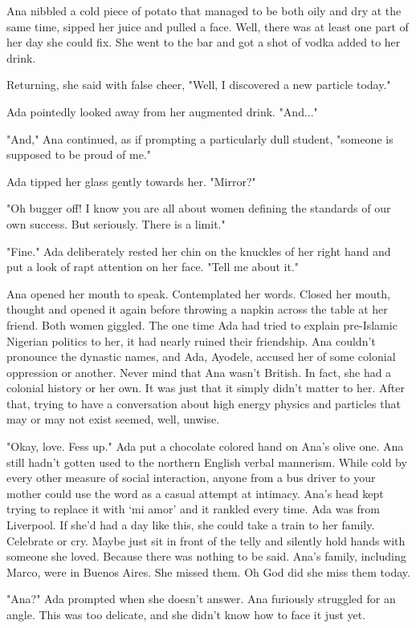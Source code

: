 \documentclass{article}
\begin{document}
Ana nibbled a cold piece of potato that managed to be both oily and dry at the same time, sipped her juice and pulled a face. Well, there was at least one part of her day she could fix. She went to the bar and got a shot of vodka added to her drink. 

Returning, she said with false cheer, "Well, I discovered a new particle today."

Ada pointedly looked away from her augmented drink. "And..."

"And," Ana continued, as if prompting a particularly dull student, "someone is supposed to be proud of me."

Ada tipped her glass gently towards her. "Mirror?"

"Oh bugger off! I know you are all about women defining the standards of our own success. But seriously. There is a limit."

"Fine." Ada deliberately rested her chin on the knuckles of her right hand and put a look of rapt attention on her face. "Tell me about it."

Ana opened her mouth to speak. Contemplated her words. Closed her mouth, thought and opened it again before throwing a napkin across the table at her friend. Both women giggled. The one time Ada had tried to explain pre-Islamic Nigerian politics to her, it had nearly ruined their friendship. Ana couldn't pronounce the dynastic names, and Ada, Ayodele, accused her of some colonial oppression or another. Never mind that Ana wasn't British. In fact, she had a colonial history or her own. It was just that it simply didn't matter to her. After that, trying to have a conversation about high energy physics and particles that may or may not exist seemed, well, unwise.

"Okay, love. Fess up." Ada put a chocolate colored hand on Ana's olive one. Ana still hadn't gotten used to the northern English verbal mannerism. While cold by every other measure of social interaction, anyone from a bus driver to your mother could use the word as a casual attempt at intimacy. Ana's head kept trying to replace it with `mi amor' and it rankled every time. Ada was from Liverpool. If she'd had a day like this, she could take a train to her family. Celebrate or cry. Maybe just sit in front of the telly and silently hold hands with someone she loved. Because there was nothing to be said. Ana's family, including Marco, were in Buenos Aires. She missed them. Oh God did she miss them today.

"Ana?" Ada prompted when she doesn't answer. Ana furiously struggled for an angle. This was too delicate, and she didn't know how to face it just yet.
\end{document}
